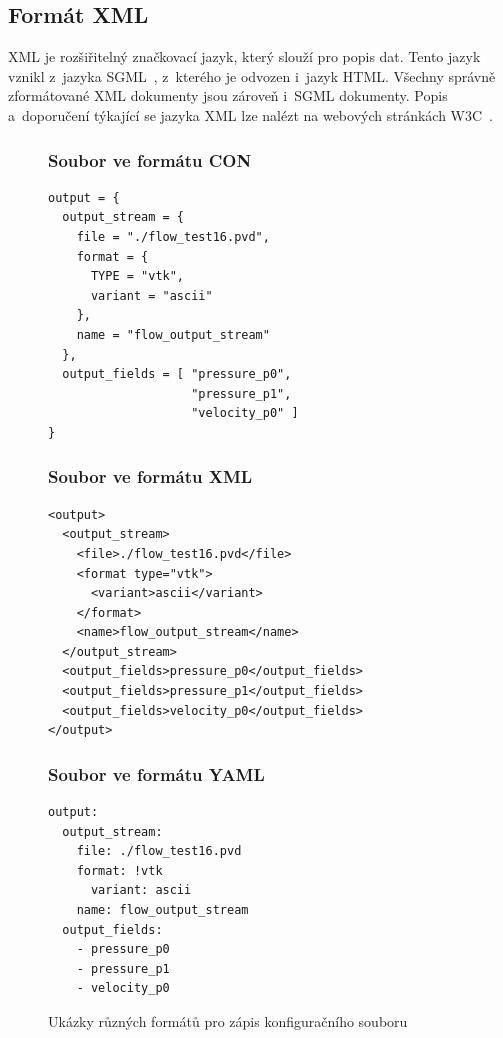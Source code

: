 \documentclass[FM,bw,DP]{tulthesis}
\begin{document}
\subsection{Formát XML}

\gls{XML} je rozšiřitelný značkovací jazyk, který slouží pro popis dat. Tento jazyk vznikl z~jazyka \gls{SGML}~\cite{bib:sgml-iso}, z~kterého je odvozen i~jazyk \gls{HTML}. Všechny správně zformátované \gls{XML} dokumenty jsou zároveň i~\gls{SGML} dokumenty. Popis a~doporučení týkající se jazyka \gls{XML} lze nalézt na webových stránkách \gls{W3C}~\cite{bib:xml}.

\begin{figure}[H]
\singlespacing
\subsubsection*{Soubor ve formátu CON}
\begin{lstlisting}
output = {
  output_stream = {
    file = "./flow_test16.pvd", 
    format = {
      TYPE = "vtk", 
      variant = "ascii"
    }, 
    name = "flow_output_stream"
  }, 
  output_fields = [ "pressure_p0",
                    "pressure_p1", 
                    "velocity_p0" ]
}
\end{lstlisting}

\subsubsection*{Soubor ve formátu XML}
\begin{lstlisting}
<output>
  <output_stream>
  	<file>./flow_test16.pvd</file>
  	<format type="vtk">
  	  <variant>ascii</variant>
  	</format>
  	<name>flow_output_stream</name>
  </output_stream>
  <output_fields>pressure_p0</output_fields>
  <output_fields>pressure_p1</output_fields>
  <output_fields>velocity_p0</output_fields>
</output>
\end{lstlisting}

\subsubsection*{Soubor ve formátu YAML}
\begin{lstlisting}
output:
  output_stream:
  	file: ./flow_test16.pvd
  	format: !vtk
  	  variant: ascii
  	name: flow_output_stream
  output_fields:
    - pressure_p0
    - pressure_p1
    - velocity_p0
\end{lstlisting}
\onehalfspacing
\caption{Ukázky různých formátů pro zápis konfiguračního souboru}
\label{img:conf_files}
\end{figure}
\end{document}
